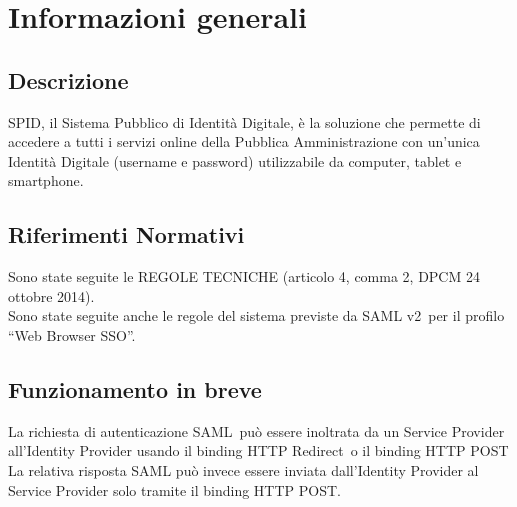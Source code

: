 \section{Informazioni generali}
\subsection{Descrizione}
SPID, il Sistema Pubblico di Identità Digitale, è la soluzione che permette di accedere a tutti i servizi online della Pubblica Amministrazione con un'unica Identità Digitale (username e password) utilizzabile da computer, tablet e smartphone.
\subsection{Riferimenti Normativi}
Sono state seguite le REGOLE TECNICHE (articolo 4, comma 2, DPCM 24 ottobre 2014).
\\ Sono state seguite anche le regole del sistema previste da SAML v2\glo\ per il profilo “Web
Browser SSO”.
\subsection{Funzionamento in breve}
La richiesta di autenticazione SAML\glo\ può essere inoltrata 
da un Service Provider all’Identity Provider
usando il binding HTTP Redirect\glo\ o il binding HTTP POST\.
\\ La relativa risposta SAML può invece essere inviata
dall’Identity Provider al Service Provider 
solo tramite il binding HTTP POST.
